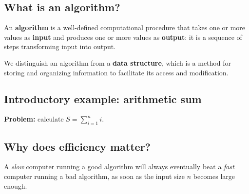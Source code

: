 \subsection{What is an algorithm?}

An \textbf{algorithm} is a well-defined computational procedure that takes one or more
values as \textbf{input} and produces one or more values as
\textbf{output}: it is a sequence of steps transforming input into output.

We distinguish an algorithm from a \textbf{data structure}, which is a method for
storing and organizing information to facilitate its access and modification.

\subsection{Introductory example: arithmetic sum}

\textbf{Problem:} calculate $\displaystyle S = \sum_{i=1}^{n} i$.

\begin{center}
\end{center}

\subsection{Why does efficiency matter?}

A \emph{slow} computer running a good algorithm will always eventually beat a
\emph{fast} computer running a bad algorithm, as soon as the input size $n$
becomes large enough.

